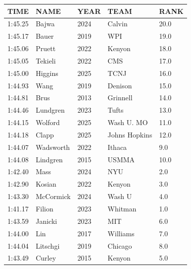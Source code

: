 \begin{table}[H]
\begin{minipage}[t]{0.48\textwidth}
\begin{tabular}{@{}p{1.8cm}p{2.8cm}p{1.2cm}p{1.4cm}p{0.8cm}@{}}
\hline
    \textbf{TIME} & \textbf{NAME} & \textbf{YEAR} & \textbf{TEAM} & \textbf{RANK} \\
\hline
    1:45.25 & Bajwa & 2024 & Calvin & 20.0 \\
    1:45.17 & Bauer & 2019 & WPI & 19.0 \\
    1:45.06 & Pruett & 2022 & Kenyon & 18.0 \\
    1:45.05 & Tekieli & 2022 & CMS & 17.0 \\
    1:45.00 & Higgins & 2025 & TCNJ & 16.0 \\
    1:44.93 & Wang & 2019 & Denison & 15.0 \\
    1:44.81 & Brus & 2013 & Grinnell & 14.0 \\
    1:44.46 & Lundgren & 2023 & Tufts & 13.0 \\
    1:44.15 & Wolford & 2025 & Wash U. MO & 11.0 \\
    1:44.18  & Clapp & 2025 & Johns Hopkins & 12.0 \\
    1:44.07 & Wadsworth & 2022 & Ithaca & 9.0 \\
    1:44.08 & Lindgren & 2015 & USMMA & 10.0 \\
    1:42.40 & Mass & 2024 & NYU & 2.0 \\
    1:42.90 & Kosian & 2022 & Kenyon & 3.0 \\
    1:43.30 & McCormick & 2024 & Wash U & 4.0 \\
    1:41.17 & Filion & 2023 & Whitman & 1.0 \\
    1:43.59 & Janicki & 2023 & MIT & 6.0 \\
    1:44.00 & Lin & 2017 & Williams & 7.0 \\
    1:44.04 & Litschgi & 2019 & Chicago & 8.0 \\
    1:43.49 & Curley & 2015 & Kenyon & 5.0 \\
\hline
\end{tabular}
\end{minipage}
\end{table}

